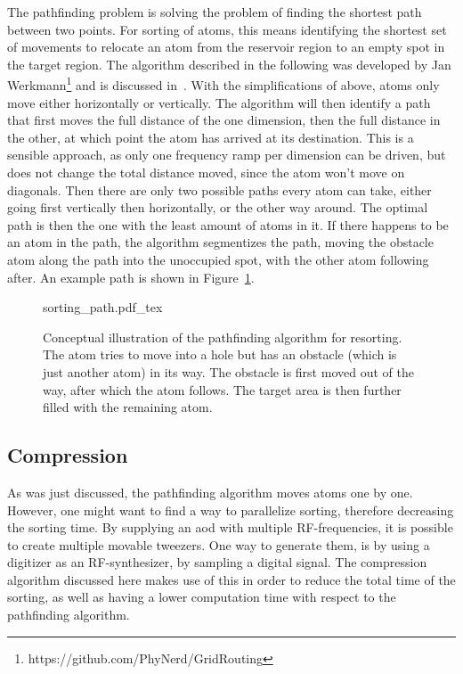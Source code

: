 The pathfinding problem is solving the problem of finding the shortest path between two points. For sorting of atoms, this means identifying the shortest set of movements to relocate an atom from the reservoir region to an empty spot in the target region.
The algorithm described in the following was developed by Jan Werkmann\footnote{https://github.com/PhyNerd/GridRouting} and is discussed in~\cite{OhldeMello2020}. With the simplifications of above, atoms only move either horizontally or vertically. The algorithm will then identify a path that first moves the full distance of the one dimension, then the full distance in the other, at which point the atom has arrived at its destination. This is a sensible approach, as only one frequency ramp per dimension can be driven, but does not change the total distance moved, since the atom won't move on diagonals.
Then there are only two possible paths every atom can take, either going first vertically then horizontally, or the other way around. The optimal path is then the one with the least amount of atoms in it. If there happens to be an atom in the path, the algorithm segmentizes the path, moving the obstacle atom along the path into the unoccupied spot, with the other atom following after. An example path is shown in Figure~\ref{fig:sorting_path}.

\begin{figure}[tbp]%
\centering
{sorting_path.pdf_tex}
\caption{Conceptual illustration of the pathfinding algorithm for resorting. The atom tries to move into a hole but has an obstacle (which is just another atom) in its way. The obstacle is first moved out of the way, after which the atom follows. The target area is then further filled with the remaining atom.}%
\label{fig:sorting_path}
\end{figure}

\subsection{Compression}%
\label{sec:compression}

As was just discussed, the pathfinding algorithm moves atoms one by one. However, one might want to find a way to parallelize sorting, therefore decreasing the sorting time. By supplying an \ac{aod} with multiple RF-frequencies, it is possible to create multiple movable tweezers. One way to generate them, is by using a digitizer as an RF-synthesizer, by sampling a digital signal. The compression algorithm discussed here makes use of this in order to reduce the total time of the sorting, as well as having a lower computation time with respect to the pathfinding algorithm.

